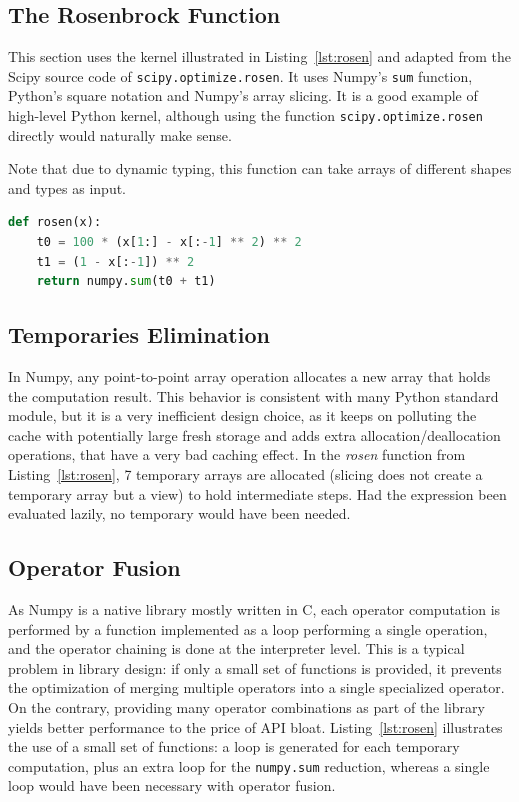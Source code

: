 \documentclass[10pt, preprint]{sigplanconf}
\begin{document}
\subsection{The Rosenbrock Function}

This section uses the kernel illustrated in Listing~\ref{lst:rosen} and adapted
from the Scipy source code of \texttt{scipy.optimize.rosen}. It uses Numpy's
\texttt{sum} function, Python's square notation and Numpy's array slicing. It
is a good example of high-level Python kernel, although using the function
\texttt{scipy.optimize.rosen} directly would naturally make sense.

Note that due to dynamic typing, this function can take arrays of different
shapes and types as input.

\begin{lstlisting}[language=python, caption={High-level implementation of the Rosenbrock function in Numpy.}, label={lst:rosen}]
def rosen(x):
    t0 = 100 * (x[1:] - x[:-1] ** 2) ** 2
    t1 = (1 - x[:-1]) ** 2
    return numpy.sum(t0 + t1)
\end{lstlisting}


\subsection{Temporaries Elimination}
\label{sec:temporaries-elimination}

In Numpy, any point-to-point array operation allocates a new array that holds
the computation result. This behavior is consistent with many Python standard
module, but it is a very inefficient design choice, as it keeps on polluting
the cache with potentially large fresh storage and adds extra
allocation/deallocation operations, that have a very bad caching effect. In the
\textit{rosen} function from Listing~\ref{lst:rosen}, 7 temporary arrays are
allocated (slicing does not create a temporary array but a view) to hold
intermediate steps. Had the expression been evaluated lazily, no temporary
would have been needed.

\subsection{Operator Fusion}
\label{sec:operator-fusion}

As Numpy is a native library mostly written in C, each operator computation is
performed by a function implemented as a loop performing a single operation,
and the operator chaining is done at the interpreter level. This is a typical
problem in library design: if only a small set of functions is provided, it
prevents the optimization of merging multiple operators into a single specialized
operator. On the contrary, providing many operator combinations as part of the library yields
better performance to the price of API bloat. Listing~\ref{lst:rosen}
illustrates the use of a small set of functions: a loop is generated for
each temporary computation, plus an extra loop for the \texttt{numpy.sum}
reduction, whereas a single loop would have been necessary with operator fusion.
\end{document}
